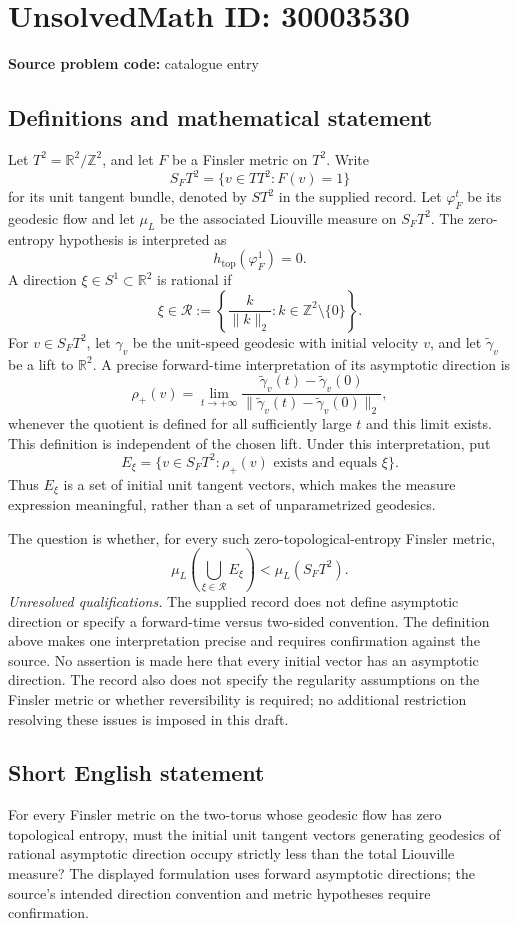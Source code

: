 \documentclass[11pt]{article}
\newcommand{\Z}{\mathbb{Z}}
\newcommand{\R}{\mathbb{R}}
\begin{document}
\section*{UnsolvedMath ID: 30003530}
\textbf{Source problem code:} catalogue entry
\subsection{Definitions and mathematical statement}
Let \(T^2=\R^2/\Z^2\), and let \(F\) be a Finsler metric on \(T^2\). Write
\[
S_FT^2=\{v\in TT^2:F(v)=1\}
\]
for its unit tangent bundle, denoted by \(ST^2\) in the supplied record. Let \(\varphi_F^t\) be its geodesic flow and let \(\mu_L\) be the associated Liouville measure on \(S_FT^2\). The zero-entropy hypothesis is interpreted as
\[
h_{\mathrm{top}}(\varphi_F^1)=0.
\]
A direction \(\xi\in S^1\subset\R^2\) is rational if
\[
\xi\in\mathcal R:=\left\{\frac{k}{\lVert k\rVert_2}:k\in\Z^2\setminus\{0\}\right\}.
\]
For \(v\in S_FT^2\), let \(\gamma_v\) be the unit-speed geodesic with initial velocity \(v\), and let \(\widetilde\gamma_v\) be a lift to \(\R^2\). A precise forward-time interpretation of its asymptotic direction is
\[
\rho_+(v)=\lim_{t\to+\infty}
\frac{\widetilde\gamma_v(t)-\widetilde\gamma_v(0)}
{\lVert\widetilde\gamma_v(t)-\widetilde\gamma_v(0)\rVert_2},
\]
whenever the quotient is defined for all sufficiently large \(t\) and this limit exists. This definition is independent of the chosen lift. Under this interpretation, put
\[
E_\xi=\{v\in S_FT^2:\rho_+(v)\text{ exists and equals }\xi\}.
\]
Thus \(E_\xi\) is a set of initial unit tangent vectors, which makes the measure expression meaningful, rather than a set of unparametrized geodesics.

The question is whether, for every such zero-topological-entropy Finsler metric,
\[
\mu_L\!\left(\bigcup_{\xi\in\mathcal R}E_\xi\right)
<\mu_L(S_FT^2).
\]
\emph{Unresolved qualifications.} The supplied record does not define asymptotic direction or specify a forward-time versus two-sided convention. The definition above makes one interpretation precise and requires confirmation against the source. No assertion is made here that every initial vector has an asymptotic direction. The record also does not specify the regularity assumptions on the Finsler metric or whether reversibility is required; no additional restriction resolving these issues is imposed in this draft.
\subsection{Short English statement}
For every Finsler metric on the two-torus whose geodesic flow has zero topological entropy, must the initial unit tangent vectors generating geodesics of rational asymptotic direction occupy strictly less than the total Liouville measure? The displayed formulation uses forward asymptotic directions; the source's intended direction convention and metric hypotheses require confirmation.
\end{document}
